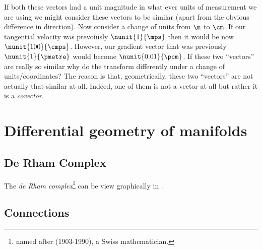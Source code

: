
If both these vectors had a unit magnitude in what ever units of
measurement we are using we might consider these vectors to be similar
(apart from the obvious difference in direction). Now consider a
change of units \eg from $\m$ to $\cm$. If our tangential velocity was
prevoiusly $\nunit{1}{\mps}$ then it would be now
$\nunit{100}{\cmps}$. However, our gradient vector that was previously
$\nunit{1}{\pmetre}$ would become $\nunit{0.01}{\pcm}$. If these two
``vectors'' are really so similar why do the transform differently
under a change of units/coordinates?  The reason is that,
geometrically, these two ``vectors'' are not actually that similar at
all. Indeed, one of them is not a vector at all but rather it is a
\emph{covector}.

\section{Differential geometry of manifolds}

\subsection{De Rham Complex}


The \emph{de Rham complex}\footnote{named after
(1903-1990), a Swiss mathematician.} can be
view graphically in .


\subsection{Connections}


